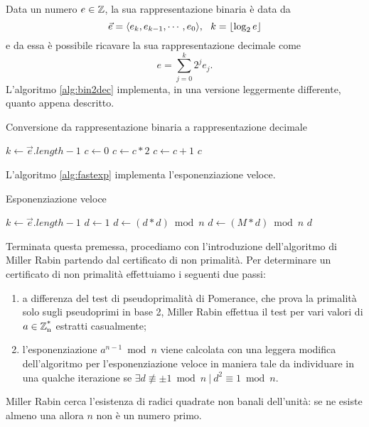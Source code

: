Data un numero $e\in\operatorname*{\mathbb{Z}}$, la sua rappresentazione binaria è data da
\[
\vec{e}=\langle e_k, e_{k-1}, \cdots, e_0 \rangle, \ \ k=\lfloor\log_2 e\rfloor
\]
e da essa è possibile ricavare la sua rappresentazione decimale come
\[
e=\sum_{j=0}^k 2^j e_j.
\]
L'algoritmo \ref{alg:bin2dec} implementa, in una versione leggermente differente, quanto appena descritto.

\begin{algorithm}
\caption{Conversione da rappresentazione binaria a rappresentazione decimale}
\label{alg:bin2dec}
\begin{algorithmic}
	\State $k \gets \vec{e}.length-1$
	\State $c \gets 0$
		\State $c \gets c*2$
			\State $c \gets c+1$
		\EndIf
	\EndFor
	\State \Return $c$
\EndFunction
\end{algorithmic}
\end{algorithm}

L'algoritmo \ref{alg:fastexp} implementa l'esponenziazione veloce.

\begin{algorithm}
\caption{Esponenziazione veloce}
\label{alg:fastexp}
\begin{algorithmic}
	\State $k \gets \vec{e}.length-1$
	\State $d \gets 1$
		\State $d \gets (d*d)\bmod n$
			\State $d \gets (M*d)\bmod n$
		\EndIf
	\EndFor
	\State \Return $d$
\EndFunction
\end{algorithmic}
\end{algorithm}

Terminata questa premessa, procediamo con l'introduzione dell'algoritmo di Miller Rabin partendo dal certificato di non primalità. Per determinare un certificato di non primalità effettuiamo i seguenti due passi:
\begin{enumerate}
\item a differenza del test di pseudoprimalità di Pomerance, che prova la primalità solo sugli pseudoprimi in base 2, Miller Rabin effettua il test per vari valori di $a\in\operatorname*{\mathbb{Z}_n^*}$ estratti casualmente;
\item l'esponenziazione $a^{n-1}\bmod n$ viene calcolata con una leggera modifica dell'algoritmo per l'esponenziazione veloce in maniera tale da individuare in una qualche iterazione se $\exists d \not\equiv \pm 1\bmod n\ |\ d^2\equiv 1\bmod n$.
\end{enumerate}
Miller Rabin cerca l'esistenza di radici quadrate non banali dell'unità: se ne esiste almeno una allora $n$ non è un numero primo.

